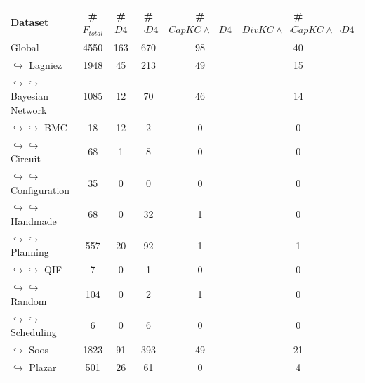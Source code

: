 \documentclass{article}
\newcommand\dfour[0]{D4\xspace}
\newcommand\divkc[0]{DivKC\xspace}
\newcommand\capkc[0]{CapKC\xspace}
\begin{document}
\begin{table}[h!]
            \caption{Experimental results regarding the scalability of \divkc and \capkc.
            Column \#$F_\textit{total}$ indicates the total number of formulae in each dataset.
            The next column shows the number of formulae compiled only by \dfour~\cite{D4} but not by \divkc or \capkc.
            Column \#$\neg\textit{\dfour}$ shows the number of formulae not compiled by \dfour.
            Column \#$\textit{CK} \land \neg \textit{\dfour}$ shows the number of formulae that are compiled by \capkc but not by \dfour.
            The last column indicates the number of formulae that were only compiled by \divkc, but not by \dfour or \capkc.
        }
        \label{divkc:tab:gen}
    \end{table}

    
\begin{table}[h!]
        \centering
        \begin{tabular}{l|c|c|c|c|c}
            Dataset & \#$F_\textit{total}$ & \#$\textit{\dfour}$ & \#$\neg \textit{\dfour}$ & \#$\textit{\capkc} \land \neg \textit{\dfour}$ & \#$\textit{\divkc} \land \neg \textit{\capkc} \land \neg \textit{\dfour}$ \\ 
            \hline
Global & 4550 & 163 & 670 & 98 & 40 \\
$\hookrightarrow$ Lagniez \cite{D4} & 1948 & 45 & 213 & 49 & 15 \\
$\hookrightarrow \hookrightarrow$ Bayesian Network & 1085 & 12 & 70 & 46 & 14 \\
$\hookrightarrow \hookrightarrow$ BMC & 18 & 12 & 2 & 0 & 0 \\
$\hookrightarrow \hookrightarrow$ Circuit & 68 & 1 & 8 & 0 & 0 \\
$\hookrightarrow \hookrightarrow$ Configuration & 35 & 0 & 0 & 0 & 0 \\
$\hookrightarrow \hookrightarrow$ Handmade & 68 & 0 & 32 & 1 & 0 \\
$\hookrightarrow \hookrightarrow$ Planning & 557 & 20 & 92 & 1 & 1 \\
$\hookrightarrow \hookrightarrow$ QIF & 7 & 0 & 1 & 0 & 0 \\
$\hookrightarrow \hookrightarrow$ Random & 104 & 0 & 2 & 1 & 0 \\
$\hookrightarrow \hookrightarrow$ Scheduling & 6 & 0 & 6 & 0 & 0 \\
$\hookrightarrow$ Soos \cite{soos_2024_10449477} & 1823 & 91 & 393 & 49 & 21 \\
$\hookrightarrow$ Plazar \cite{Plazar2019} & 501 & 26 & 61 & 0 & 4 \\

\end{tabular}
\end{table}
\end{document}
